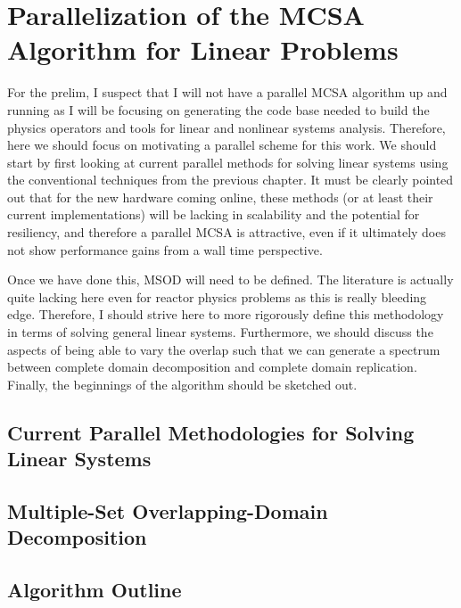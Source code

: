 \chapter{Parallelization of the MCSA Algorithm for Linear Problems}
\label{ch:parallel_mcsa}

For the prelim, I suspect that I will not have a parallel MCSA
algorithm up and running as I will be focusing on generating the code
base needed to build the physics operators and tools for linear and
nonlinear systems analysis. Therefore, here we should focus on
motivating a parallel scheme for this work. We should start by first
looking at current parallel methods for solving linear systems using
the conventional techniques from the previous chapter. It must be
clearly pointed out that for the new hardware coming online, these
methods (or at least their current implementations) will be lacking in
scalability and the potential for resiliency, and therefore a parallel
MCSA is attractive, even if it ultimately does not show performance
gains from a wall time perspective.

Once we have done this, MSOD will need to be defined. The literature
is actually quite lacking here even for reactor physics problems as
this is really bleeding edge. Therefore, I should strive here to more
rigorously define this methodology in terms of solving general linear
systems. Furthermore, we should discuss the aspects of being able to
vary the overlap such that we can generate a spectrum between complete
domain decomposition and complete domain replication. Finally, the
beginnings of the algorithm should be sketched out.

\section{Current Parallel Methodologies for Solving Linear Systems}
\label{sec:current_parallel_methods}

\section{Multiple-Set Overlapping-Domain Decomposition}
\label{sec:msod}

\section{Algorithm Outline}
\label{sec:parallel_mcsa_algorithm_outline}
